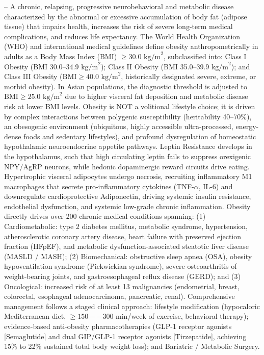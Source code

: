-- A chronic, relapsing, progressive neurobehavioral and metabolic disease characterized by the abnormal or excessive accumulation of body fat (adipose tissue) that impairs health, increases the risk of severe long-term medical complications, and reduces life expectancy. The World Health Organization (WHO) and international medical guidelines define obesity anthropometrically in adults as a Body Mass Index (BMI) $\ge 30.0\text{ kg/m}^2$, subclassified into: Class I Obesity (BMI 30.0--34.9 $\text{kg/m}^2$); Class II Obesity (BMI 35.0--39.9 $\text{kg/m}^2$); and Class III Obesity ($\text{BMI} \ge 40.0\text{ kg/m}^2$, historically designated severe, extreme, or morbid obesity). In Asian populations, the diagnostic threshold is adjusted to $\text{BMI} \ge 25.0\text{ kg/m}^2$ due to higher visceral fat deposition and metabolic disease risk at lower BMI levels. Obesity is NOT a volitional lifestyle choice; it is driven by complex interactions between polygenic susceptibility (heritability 40--70\%), an obesogenic environment (ubiquitous, highly accessible ultra-processed, energy-dense foods and sedentary lifestyles), and profound dysregulation of homeostatic hypothalamic neuroendocrine appetite pathways. Leptin Resistance develops in the hypothalamus, such that high circulating leptin fails to suppress orexigenic NPY/AgRP neurons, while hedonic dopaminergic reward circuits drive eating. Hypertrophic visceral adipocytes undergo necrosis, recruiting inflammatory M1 macrophages that secrete pro-inflammatory cytokines (TNF-$\alpha$, IL-6) and downregulate cardioprotective Adiponectin, driving systemic insulin resistance, endothelial dysfunction, and systemic low-grade chronic inflammation. Obesity directly drives over 200 chronic medical conditions spanning: (1) Cardiometabolic: type 2 diabetes mellitus, metabolic syndrome, hypertension, atherosclerotic coronary artery disease, heart failure with preserved ejection fraction (HFpEF), and metabolic dysfunction-associated steatotic liver disease (MASLD / MASH); (2) Biomechanical: obstructive sleep apnea (OSA), obesity hypoventilation syndrome (Pickwickian syndrome), severe osteoarthritis of weight-bearing joints, and gastroesophageal reflux disease (GERD); and (3) Oncological: increased risk of at least 13 malignancies (endometrial, breast, colorectal, esophageal adenocarcinoma, pancreatic, renal). Comprehensive management follows a staged clinical approach: lifestyle modification (hypocaloric Mediterranean diet, $\ge 150--300$ min/week of exercise, behavioral therapy); evidence-based anti-obesity pharmacotherapies (GLP-1 receptor agonists [Semaglutide] and dual GIP/GLP-1 receptor agonists [Tirzepatide], achieving 15\% to 22\% sustained total body weight loss); and Bariatric / Metabolic Surgery.

